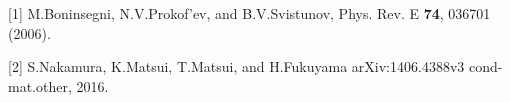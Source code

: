 \documentclass[a4j,12pt]{jarticle}
\begin{document}


\vspace{5mm}
\parindent 0mm


[1]  M.Boninsegni, N.V.Prokof'ev, and B.V.Svistunov, Phys. Rev. E {\bf74}, 036701 (2006).


[2] S.Nakamura, K.Matsui, T.Matsui, and H.Fukuyama arXiv:1406.4388v3 cond-mat.other, 2016.

\end{document}
